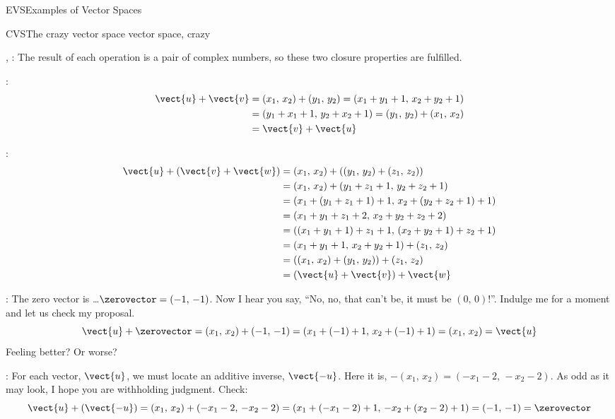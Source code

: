 \begin{subsect}{EVS}{Examples of Vector Spaces}
\begin{example}{CVS}{The crazy vector space }{vector space, crazy}
%
\begin{para}, :  The result of each operation is a pair of complex numbers, so these two closure properties are fulfilled.\end{para}
%
\begin{para}:
%
\begin{align*}
\vect{u}+\vect{v}&=(x_1,\,x_2)+(y_1,\,y_2)=(x_1+y_1+1,\,x_2+y_2+1)\\
&=(y_1+x_1+1,\,y_2+x_2+1)=(y_1,\,y_2)+(x_1,\,x_2)\\
&=\vect{v}+\vect{u}
\end{align*}
\end{para}
%
\begin{para}:
%
\begin{align*}
\vect{u}+(\vect{v}+\vect{w})&=(x_1,\,x_2)+\left((y_1,\,y_2)+(z_1,\,z_2)\right)\\
&=(x_1,\,x_2)+(y_1+z_1+1,\,y_2+z_2+1)\\
&=(x_1+(y_1+z_1+1)+1,\,x_2+(y_2+z_2+1)+1)\\
&=(x_1+y_1+z_1+2,\,x_2+y_2+z_2+2)\\
&=((x_1+y_1+1)+z_1+1,\,(x_2+y_2+1)+z_2+1)\\
&=(x_1+y_1+1,\,x_2+y_2+1)+(z_1,\,z_2)\\
&=\left((x_1,\,x_2)+(y_1,\,y_2)\right)+(z_1,\,z_2)\\
&=\left(\vect{u}+\vect{v}\right)+\vect{w}
\end{align*}
\end{para}
%
\begin{para}:  The zero vector is \dots $\zerovector=(-1,\,-1)$.  Now I hear you say, ``No, no, that can't be, it must be $(0,\,0)$!''.  Indulge me for a moment and let us check my proposal.
%
\begin{equation*}
%
\vect{u}+\zerovector=(x_1,\,x_2)+(-1,\,-1)=(x_1+(-1)+1,\,x_2+(-1)+1)=(x_1,\,x_2)=\vect{u}
%
\end{equation*}
%
Feeling better?  Or worse?\end{para}
%
\begin{para}:  For each vector, $\vect{u}$, we must locate an additive inverse, $\vect{-u}$.  Here it is, $-(x_1,\,x_2)=(-x_1-2,\,-x_2-2)$.  As odd as it may look, I hope you are withholding judgment.  Check:
%
\begin{equation*}
\vect{u}+ (\vect{-u})=(x_1,\,x_2)+(-x_1-2,\,-x_2-2)=(x_1+(-x_1-2)+1,\,-x_2+(x_2-2)+1)=(-1,\,-1)=\zerovector

\end{equation*}
\end{para}
\end{example}
\end{subsect}
